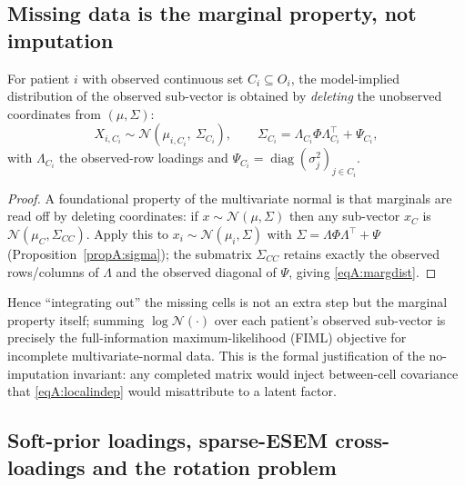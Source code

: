 \subsection{Missing data is the marginal property, not imputation}
\label{annA:obs}

\begin{proposition}[Marginalization]\label{propA:marg}
For patient $i$ with observed continuous set $C_i\subseteq O_i$, the model-implied
distribution of the observed sub-vector is obtained by \emph{deleting} the unobserved
coordinates from $(\mu,\Sigma)$:
\begin{equation}
  X_{i,C_i}\sim\mathcal{N}\!\left(\mu_{i,C_i},\ \Sigma_{C_i}\right),\qquad
  \Sigma_{C_i}=\Lambda_{C_i}\Phi\Lambda_{C_i}^{\top}+\Psi_{C_i},
  \label{eqA:margdist}
\end{equation}
with $\Lambda_{C_i}$ the observed-row loadings and
$\Psi_{C_i}=\operatorname{diag}(\sigma_j^2)_{j\in C_i}$.
\end{proposition}
\begin{proof}
A foundational property of the multivariate normal is that marginals are read off by
deleting coordinates: if $x\sim\mathcal N(\mu,\Sigma)$ then any sub-vector $x_{C}$ is
$\mathcal N(\mu_C,\Sigma_{CC})$. Apply this to $x_i\sim\mathcal N(\mu_i,\Sigma)$ with
$\Sigma=\Lambda\Phi\Lambda^\top+\Psi$ (Proposition~\ref{propA:sigma}); the submatrix
$\Sigma_{CC}$ retains exactly the observed rows/columns of $\Lambda$ and the observed
diagonal of $\Psi$, giving \eqref{eqA:margdist}.
\end{proof}
Hence ``integrating out'' the missing cells is not an extra step but the marginal
property itself; summing $\log\mathcal N(\cdot)$ over each patient's observed
sub-vector is precisely the full-information maximum-likelihood (FIML) objective for
incomplete multivariate-normal data. This is the formal justification of the
no-imputation invariant: any completed matrix would inject between-cell covariance that
\eqref{eqA:localindep} would misattribute to a latent factor.

\subsection{Soft-prior loadings, sparse-ESEM cross-loadings and the rotation problem}
\label{annA:rotation}

